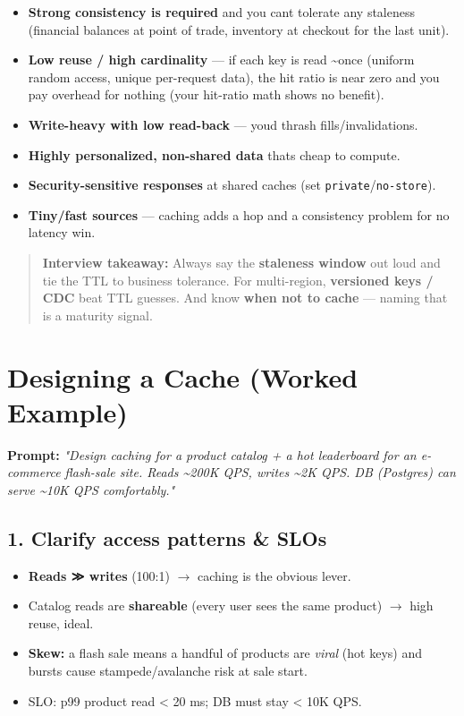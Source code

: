 \documentclass[11pt]{article}
\providecommand{\tightlist}{\setlength{\itemsep}{1pt}\setlength{\parskip}{0pt}}
\begin{document}
\begin{itemize}
\tightlist
\item
  \textbf{Strong consistency is required} and you can\textquotesingle t tolerate any staleness (financial balances at point of trade, inventory at checkout for the last unit).
\item
  \textbf{Low reuse / high cardinality} --- if each key is read \textasciitilde once (uniform random access, unique per-request data), the hit ratio is near zero and you pay overhead for nothing (your hit-ratio math shows no benefit).
\item
  \textbf{Write-heavy with low read-back} --- you\textquotesingle d thrash fills/invalidations.
\item
  \textbf{Highly personalized, non-shared data} that\textquotesingle s cheap to compute.
\item
  \textbf{Security-sensitive responses} at shared caches (set \texttt{private}/\texttt{no-store}).
\item
  \textbf{Tiny/fast sources} --- caching adds a hop and a consistency problem for no latency win.
\end{itemize}

\begin{quote}
\textbf{Interview takeaway:} Always say the \textbf{staleness window} out loud and tie the TTL to business tolerance. For multi-region, \textbf{versioned keys / CDC} beat TTL guesses. And know \textbf{when not to cache} --- naming that is a maturity signal.
\end{quote}

\section{Designing a Cache (Worked Example)}\label{designing-a-cache-worked-example}

\textbf{Prompt:} \emph{"Design caching for a product catalog + a hot leaderboard for an e-commerce flash-sale site. Reads \textasciitilde200K QPS, writes \textasciitilde2K QPS. DB (Postgres) can serve \textasciitilde10K QPS comfortably."}

\subsection{1. Clarify access patterns \& SLOs}\label{1-clarify-access-patterns--slos}

\begin{itemize}
\tightlist
\item
  \textbf{Reads ≫ writes} (100:1) \(\rightarrow\) caching is the obvious lever.
\item
  Catalog reads are \textbf{shareable} (every user sees the same product) \(\rightarrow\) high reuse, ideal.
\item
  \textbf{Skew:} a flash sale means a handful of products are \emph{viral} (hot keys) and bursts cause stampede/avalanche risk at sale start.
\item
  SLO: p99 product read \textless{} 20 ms; DB must stay \textless{} 10K QPS.
\end{itemize}
\end{document}
